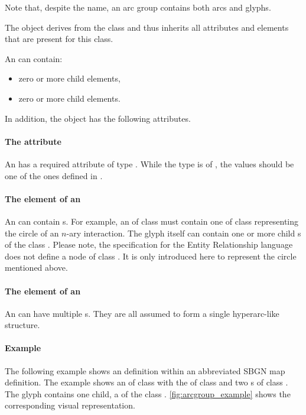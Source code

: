 Note that, despite the name, an arc group contains both arcs and glyphs.


The \ArcGroup object derives from the \SbgnBase class and thus inherits all
attributes and elements that are present for this class.

An \ArcGroup can contain:

\begin{itemize}
  \item zero or more child \Glyph elements,
  \item zero or more child \Arc elements.
\end{itemize}

In addition, the \ArcGroup object has the following attributes.

\paragraph{The \fixttspace{} attribute}

An \ArcGroup has a required attribute  of type
. While the type is of , the values should be one of the ones defined in .

\paragraph{The \Glyph element of an \ArcGroup}
An \ArcGroup can contain \Glyph{}s. For example, an \ArcGroup of class  must contain one \Glyph of class  representing the circle of an $n$-ary interaction. The glyph itself can contain one or more child \Glyph{}s of the class . Please note, the  specification for the Entity Relationship language does not define a \Glyph node of class . It is only introduced here to represent the circle mentioned above.

\paragraph{The \Arc element of an \ArcGroup}
An \ArcGroup can have multiple \Arc{}s. They are all assumed to form a single hyperarc-like structure.

\paragraph{Example}

The following example shows an \ArcGroup definition within an abbreviated SBGN map definition. The example shows an \ArcGroup of class  with the \Glyph of class  and two \Arc{}s of class . The glyph contains one child, a \Glyph of the class . \ref{fig:arcgroup_example} shows the corresponding visual representation.

